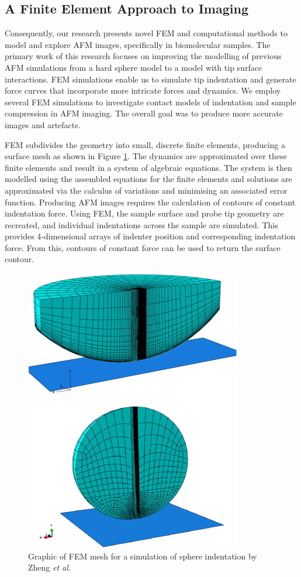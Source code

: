 \subsection{A Finite Element Approach to Imaging}

Consequently, our research presents novel FEM and computational methods to model and explore AFM images, specifically in biomolecular samples. The primary work of this research focuses on improving the modelling of previous AFM simulations from a hard sphere model to a model with tip surface interactions. FEM simulations enable us to simulate tip indentation and generate force curves that incorporate more intricate forces and dynamics. We employ several FEM simulations to investigate contact models of indentation and sample compression in AFM imaging. The overall goal was to produce more accurate images and artefacts. 

FEM subdivides the geometry into small, discrete finite elements, producing a surface mesh as shown in Figure \ref{fig: FEM model}. The dynamics are approximated over these finite elements and result in a system of algebraic equations. The system is then modelled using the assembled equations for the finite elements and solutions are approximated via the calculus of variations and minimising an associated error function. Producing AFM images requires the calculation of contours of constant indentation force. Using FEM, the sample surface and probe tip geometry are recreated, and individual indentations across the sample are simulated. This provides 4-dimensional arrays of indenter position and corresponding indentation force. From this, contours of constant force can be used to return the surface contour.


\begin{figure}[H]
    \centering
    \includegraphics[trim = 0 0 0 130, clip, width=0.38\linewidth]{Figures/FEM mode.jpg}
    \caption{Graphic of FEM mesh for a simulation of sphere indentation by Zheng \textit{et al.}\cite{zheng2012finite}}
    \label{fig: FEM model}
\end{figure}


